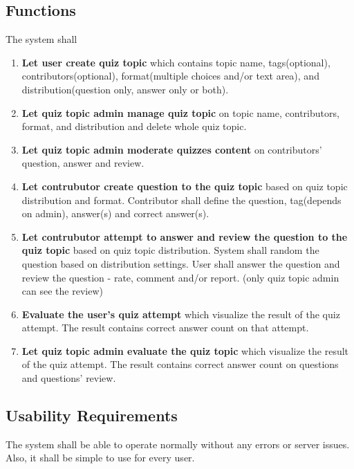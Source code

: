 \documentclass[ 10pt]{report}
\begin{document}
        \subsection{Functions}
        The system shall
        \begin{enumerate}
            \item \textbf{Let user create quiz topic} which contains topic name, tags(optional), contributors(optional), format(multiple choices and/or text area), and distribution(question only, answer only or both).
            \item \textbf{Let quiz topic admin manage quiz topic} on topic name, contributors, format, and distribution and delete whole quiz topic.
            \item \textbf{Let quiz topic admin moderate quizzes content} on contributors' question, answer and review.
            \item \textbf{Let contrubutor create question to the quiz topic} based on quiz topic distribution and format. Contributor shall define the question, tag(depends on admin), answer(s) and correct answer(s).
            \item \textbf{Let contrubutor attempt to answer and review the question to the quiz topic} based on quiz topic distribution. System shall random the question based on distribution settings. User shall answer the question and review the question - rate, comment and/or report. (only quiz topic admin can see the review)
            \item \textbf{Evaluate the user's quiz attempt} which visualize the result of the quiz attempt. The result contains correct answer count on that attempt.
            \item \textbf{Let quiz topic admin evaluate the quiz topic} which visualize the result of the quiz attempt. The result contains correct answer count on questions and questions' review.
        \end{enumerate}
        \subsection{Usability Requirements}
        The system shall be able to operate normally without any errors or server issues. Also, it shall be simple to use for every user.
\end{document}

